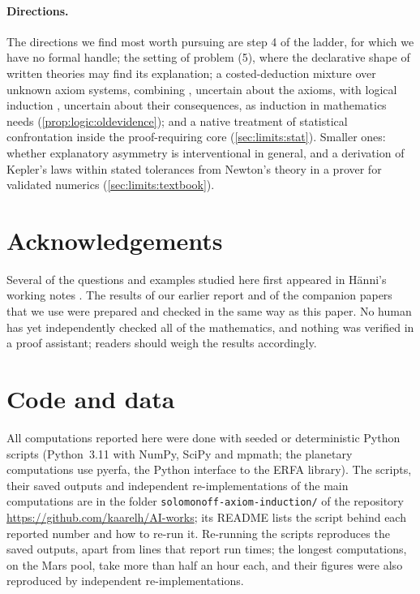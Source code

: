 \paragraph{Directions.} The directions we find most worth pursuing are step 4 of the ladder, for which we have no formal handle; the setting of problem (5), where the declarative shape of written theories may find its explanation; a costed-deduction mixture over unknown axiom systems, combining \SAIabbr, uncertain about the axioms, with logical induction \citep{garrabrant2016logical}, uncertain about their consequences, as induction in mathematics needs (\cref{prop:logic:oldevidence}); and a native treatment of statistical confrontation inside the proof-requiring core (\cref{sec:limits:stat}). Smaller ones: whether explanatory asymmetry is interventional in general, and a derivation of Kepler's laws within stated tolerances from Newton's theory in a prover for validated numerics (\cref{sec:limits:textbook}).

\section*{Acknowledgements}
Several of the questions and examples studied here first appeared in H\"anni's working notes \citep{hanni2026notes}. The results of our earlier report \citep{claude2026axiominduction} and of the companion papers \citep{claudeSFI2026fundamentals,claudeSFI2026steeper} that we use were prepared and checked in the same way as this paper. No human has yet independently checked all of the mathematics, and nothing was verified in a proof assistant; readers should weigh the results accordingly.

\section*{Code and data}
All computations reported here were done with seeded or deterministic Python scripts (Python~3.11 with NumPy, SciPy and mpmath; the planetary computations use pyerfa, the Python interface to the ERFA library). The scripts, their saved outputs and independent re-implementations of the main computations are in the folder \texttt{solomonoff-axiom-induction/} of the repository \url{https://github.com/kaarelh/AI-works}; its README lists the script behind each reported number and how to re-run it. Re-running the scripts reproduces the saved outputs, apart from lines that report run times; the longest computations, on the Mars pool, take more than half an hour each, and their figures were also reproduced by independent re-implementations.
